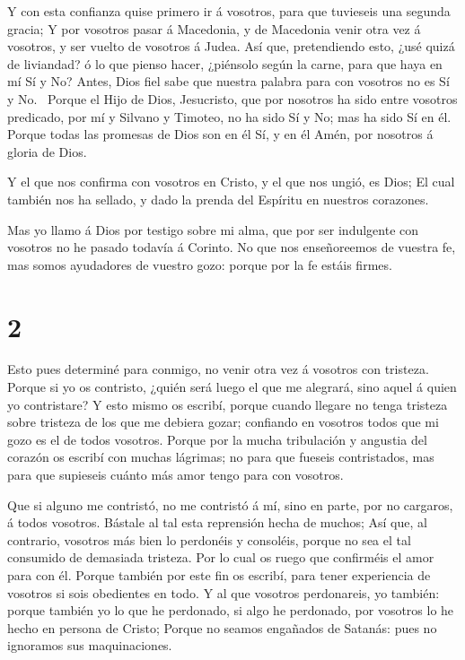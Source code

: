  Y con esta confianza quise primero ir á vosotros, para que
tuvieseis una segunda gracia;  Y por vosotros pasar á
Macedonia, y de Macedonia venir otra vez á vosotros, y ser vuelto de
vosotros á Judea.  Así que, pretendiendo esto, ¿usé quizá
de liviandad? ó lo que pienso hacer, ¿piénsolo según la carne, para que
haya en mí Sí y No?  Antes, Dios fiel sabe que nuestra
palabra para con vosotros no es Sí y No.~ Porque el Hijo de
Dios, Jesucristo, que por nosotros ha sido entre vosotros predicado, por
mí y Silvano y Timoteo, no ha sido Sí y No; mas ha sido Sí en él.
 Porque todas las promesas de Dios son en él Sí, y en él
Amén, por nosotros á gloria de Dios.

 Y el que nos confirma con vosotros en Cristo, y el que nos
ungió, es Dios;  El cual también nos ha sellado, y dado la
prenda del Espíritu en nuestros corazones.

 Mas yo llamo á Dios por testigo sobre mi alma, que por ser
indulgente con vosotros no he pasado todavía á Corinto.  No
que nos enseñoreemos de vuestra fe, mas somos ayudadores de vuestro
gozo: porque por la fe estáis firmes.

\hypertarget{section-1}{%
\section{2}\label{section-1}}

 Esto pues determiné para conmigo, no venir otra vez á
vosotros con tristeza.  Porque si yo os contristo, ¿quién
será luego el que me alegrará, sino aquel á quien yo contristare?
 Y esto mismo os escribí, porque cuando llegare no tenga
tristeza sobre tristeza de los que me debiera gozar; confiando en
vosotros todos que mi gozo es el de todos vosotros.  Porque
por la mucha tribulación y angustia del corazón os escribí con muchas
lágrimas; no para que fueseis contristados, mas para que supieseis
cuánto más amor tengo para con vosotros.

 Que si alguno me contristó, no me contristó á mí, sino en
parte, por no cargaros, á todos vosotros.  Bástale al tal
esta reprensión hecha de muchos;  Así que, al contrario,
vosotros más bien lo perdonéis y consoléis, porque no sea el tal
consumido de demasiada tristeza.  Por lo cual os ruego que
confirméis el amor para con él.  Porque también por este fin
os escribí, para tener experiencia de vosotros si sois obedientes en
todo.  Y al que vosotros perdonareis, yo también: porque
también yo lo que he perdonado, si algo he perdonado, por vosotros lo he
hecho en persona de Cristo;  Porque no seamos engañados de
Satanás: pues no ignoramos sus maquinaciones.

